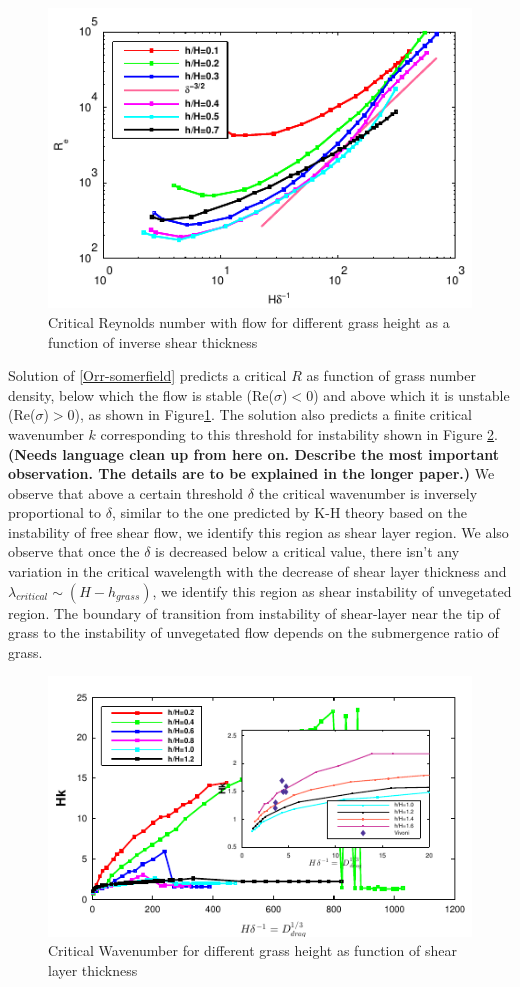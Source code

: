 \documentclass[aps,prl,twocolumn,showpacs,superscriptaddress,groupedaddress,10pt]{revtex4-1}  %
\newcommand{\shreyas}[1]{{\bf (#1)}}
\begin{document}
\begin{figure}[htb]
\includegraphics[]{Critical_Re_vs_delta}
\caption{Critical Reynolds number with flow for different grass height as a function of inverse shear thickness}
\label{Re_vs_delta}
\end{figure}
Solution of \eqref{Orr-somerfield} predicts a critical $R$ as function of grass number density, below which the flow is stable (Re($\sigma$)$<0$) and above which it is unstable (Re($\sigma$)$>0$),
as shown in Figure\ref{Re_vs_delta}. The solution also predicts a finite critical wavenumber $k$ corresponding to this threshold for instability shown in Figure \ref{K_vs_shear}. 
\shreyas{Needs language clean up from here on. Describe the most important observation. The details are to be explained in the longer paper.}
We observe that above a 
certain threshold $\delta$ the critical wavenumber is inversely proportional to $\delta$, similar to the one predicted by K-H theory based on the instability of free shear flow,
we identify this region as shear layer region. We also observe that once the $\delta$ is decreased below a critical value, there isn't any variation in the 
critical wavelength with the decrease of shear layer thickness and $\lambda_{critical} \sim (H-h_{grass})$, we identify this region as shear instability of unvegetated region.
The boundary of transition from instability of shear-layer near the tip of grass to the instability of unvegetated flow depends on the submergence ratio of grass. 
\begin{figure}[htb]
\includegraphics[]{K_vs_shear_width_noshear}
\caption{Critical Wavenumber for different grass height as function of shear layer thickness}
\label{K_vs_shear}
\end{figure}
\end{document}
